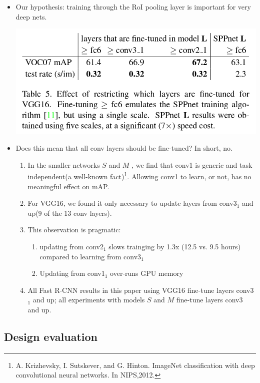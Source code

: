 \documentclass[11pt]{article}
\begin{document}
\begin{itemize}
\item Our hypothesis: training through the RoI pooling layer is important for very deep nets.

      \includegraphics[width=.9\linewidth]{./pic_fast_rcnn/table5.png}
\item Does this mean that all conv layers should be fine-tuned?
      In short, no.
\begin{enumerate}
\item In the smaller networks $S$ and $M$ , we find that conv1 is generic and task 
         independent(a well-known fact)\footnote{A. Krizhevsky, I. Sutskever, and G. Hinton.  
ImageNet classification with deep convolutional neural networks. 
In NIPS,2012.
 }. Allowing conv1 to learn, or not, has no
         meaningful effect on mAP.
\item For VGG16, we found it only necessary to update layers from conv3$_1$ and up(9 of the 13
         conv layers).
\item This observation is pragmatic:
\begin{enumerate}
\item updating from conv2$_1$ slows trainging by 1.3x (12.5 vs. 9.5 hours) compared to 
            learning from conv3$_1$
\item Updating from conv1$_1$ over-runs GPU memory
\end{enumerate}
\item All Fast R-CNN results in this paper using VGG16 fine-tune layers conv3$_1$ and up;
         all experiments with models $S$ and $M$ fine-tune layers conv3 and up.
\end{enumerate}
\end{itemize}
         
\subsection{Design evaluation}
\label{sec-1-4}
\end{document}
